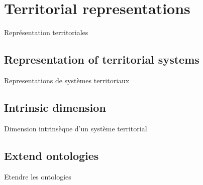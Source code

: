 \newpage

\section{Territorial representations}{Représentation territoriales}





\subsection{Representation of territorial systems}{Representations de systèmes territoriaux}



\subsection{Intrinsic dimension}{Dimension intrinsèque d'un système territorial}



\subsection{Extend ontologies}{Etendre les ontologies}










\stars
